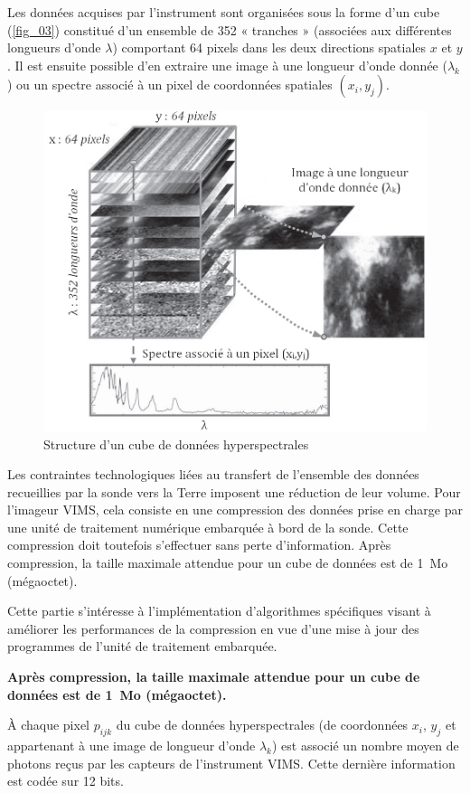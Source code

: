 \documentclass[10pt,fleqn]{article} %
\begin{document}
Les données acquises par l'instrument sont organisées sous la forme d'un cube (\autoref{fig_03})
constitué d'un ensemble de 352 « tranches » (associées aux différentes longueurs d'onde $\lambda$)
comportant 64 pixels dans les deux directions spatiales $x$ et $y$. Il est ensuite possible d'en
extraire une image à une longueur d'onde donnée ($\lambda_k$) ou un spectre associé à un pixel de
coordonnées spatiales $(x_i,y_j)$.

\begin{figure}[H]
\centering
\includegraphics[width=.7\linewidth]{images/fig_03}
\caption{Structure d'un cube de données hyperspectrales \label{fig_03}}
\end{figure}



Les contraintes technologiques liées au transfert de l'ensemble des données recueillies par la
sonde vers la Terre imposent une réduction de leur volume. Pour l'imageur VIMS, cela consiste
en une compression des données prise en charge par une unité de traitement numérique embarquée
à bord de la sonde. Cette compression doit toutefois s'effectuer sans perte d'information.
Après compression, la taille maximale attendue pour un cube de données est de \SI{1}{Mo} (mégaoctet).

\begin{obj}
Cette partie s'intéresse à l'implémentation d'algorithmes spécifiques visant à améliorer
les performances de la compression en vue d'une mise à jour des programmes
de l'unité de traitement embarquée.

\textbf{Après compression, la taille maximale attendue pour un cube de données est de \SI{1}{Mo} (mégaoctet).}
\end{obj}



À chaque pixel $p_{ijk}$ du cube de données hyperspectrales (de coordonnées $x_i$, $y_j$ et appartenant
à une image de longueur d'onde $\lambda_k$) est associé un nombre moyen de photons reçus par les
capteurs de l'instrument VIMS. Cette dernière information est codée sur 12 bits.
\end{document}

